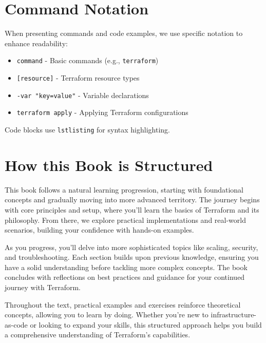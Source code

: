 \section*{Command Notation}

When presenting commands and code examples, we use specific notation to enhance readability:
\begin{itemize}
    \item \texttt{command} - Basic commands (e.g., \texttt{terraform})
    \item \texttt{[resource]} - Terraform resource types
    \item \texttt{-var "key=value"} - Variable declarations
    \item \texttt{terraform apply} - Applying Terraform configurations
\end{itemize}

Code blocks use \texttt{lstlisting} for syntax highlighting.

\section*{How this Book is Structured}

This book follows a natural learning progression, starting with foundational concepts and gradually moving into more advanced territory. The journey begins with core principles and setup, where you'll learn the basics of Terraform and its philosophy. From there, we explore practical implementations and real-world scenarios, building your confidence with hands-on examples.

As you progress, you'll delve into more sophisticated topics like scaling, security, and troubleshooting. Each section builds upon previous knowledge, ensuring you have a solid understanding before tackling more complex concepts. The book concludes with reflections on best practices and guidance for your continued journey with Terraform.

Throughout the text, practical examples and exercises reinforce theoretical concepts, allowing you to learn by doing. Whether you're new to infrastructure-as-code or looking to expand your skills, this structured approach helps you build a comprehensive understanding of Terraform's capabilities.

\clearpage
